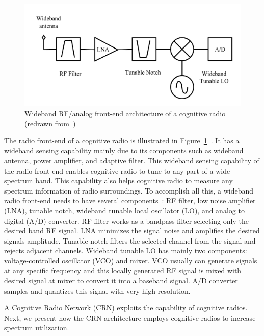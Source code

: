 \begin{figure}[!htbp]
\begin{center}
    \includegraphics[scale=0.5]{myFigures/RFFrontEnd}
    \caption{Wideband RF/analog front-end architecture of a cognitive radio (redrawn from~\cite{cabric2004implementation})}
    \label{fig:RFFrontEnd}
\end{center}
\end{figure}

The radio front-end of a cognitive radio is illustrated in Figure~\ref{fig:RFFrontEnd}~\cite{cabric2004implementation}. It has a wideband sensing capability mainly due to its components such as wideband antenna, power amplifier, and adaptive filter. This wideband sensing capability of the radio front end enables cognitive radio to tune to any part of a wide spectrum band. This capability also helps cognitive radio to measure any spectrum information of radio surroundings. To accomplish all this, a wideband radio front-end needs to have several components~\cite{akyildiz2006next}: RF filter, low noise amplifier (LNA), tunable notch, wideband tunable local oscillator (LO), and analog to digital (A/D) converter. RF filter works as a bandpass filter selecting only the desired band RF signal. LNA minimizes the signal noise and amplifies the desired signals amplitude. Tunable notch filters the selected channel from the signal and rejects adjacent channels. Wideband tunable LO has mainly two components: voltage-controlled oscillator (VCO) and mixer. VCO usually can generate signals at any specific frequency and this locally generated RF signal is mixed with desired signal at mixer to convert it into a baseband signal. A/D converter samples and quantizes this signal with very high resolution.


A Cognitive Radio Network (CRN) exploits the capability of cognitive radios. Next, we present how the CRN architecture employs cognitive radios to increase spectrum utilization.

